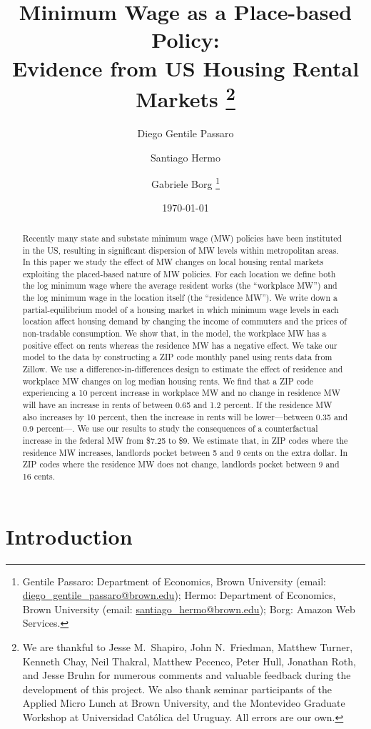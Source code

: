 \documentclass{article}
\title{ Minimum Wage as a Place-based Policy: \\
        Evidence from US Housing Rental Markets%
        \thanks{We are thankful to Jesse M.\ Shapiro, John N.\ Friedman, 
        Matthew Turner, Kenneth Chay, Neil Thakral, Matthew Pecenco, Peter Hull,
        Jonathan Roth, and Jesse Bruhn 
        for numerous comments and valuable feedback during the development of 
        this project.
        We also thank seminar participants of the Applied Micro Lunch at Brown
        University, and the Montevideo Graduate Workshop at Universidad Católica 
        del Uruguay.
        All errors are our own.}}
\author{Diego Gentile Passaro \and Santiago Hermo \and Gabriele Borg
        \footnote{Gentile Passaro: Department of Economics, Brown University 
        (email: \url{diego_gentile_passaro@brown.edu}); 
        Hermo: Department of Economics, Brown University 
        (email: \url{santiago_hermo@brown.edu});
        Borg: Amazon Web Services.}}
\date{\today}
\begin{document}
\maketitle

\begin{abstract}
    \noindent
    Recently many state and substate minimum wage (MW) policies have been 
    instituted in the US, resulting in significant dispersion of MW levels 
    within metropolitan areas.
    In this paper we study the effect of MW changes on local housing rental 
    markets exploiting the placed-based nature of MW policies.
    For each location we define both
    the log minimum wage where the average resident works (the ``workplace MW'')
    and the log minimum wage in the location itself (the ``residence MW'').
    We write down a partial-equilibrium model of a housing market
    in which minimum wage levels in each location affect housing demand by 
    changing the income of commuters and the prices of non-tradable consumption. 
    We show that, in the model, the workplace MW has a positive effect on rents 
    whereas the residence MW has a negative effect.
    We take our model to the data by constructing a ZIP code monthly panel 
    using rents data from Zillow.
    We use a difference-in-differences design to estimate the effect of 
    residence and workplace MW changes on log median housing rents.
    We find that a ZIP code experiencing a 10 percent increase in workplace MW
    and no change in residence MW will have an increase in rents of between 
    0.65 and 1.2 percent.
    If the residence MW also increases by 10 percent, then the increase in 
    rents will be lower---between 0.35 and 0.9 percent---.
    We use our results to study the consequences of a counterfactual increase in 
    the federal MW from \$7.25 to \$9.
    We estimate that, in ZIP codes where the residence MW increases, landlords 
    pocket between 5 and 9 cents on the extra dollar.
    In ZIP codes where the residence MW does not change, landlords pocket between 
    9 and 16 cents.
\end{abstract}

\vspace{5mm}


\clearpage

\section{Introduction}\label{sec:intro}
    
\end{document}
